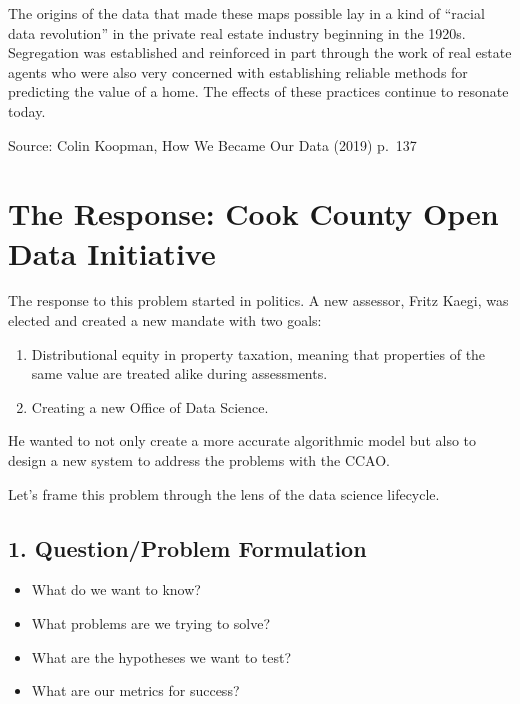 \documentclass[
  letterpaper,
  DIV=11,
  numbers=noendperiod]{scrreprt}
\providecommand{\tightlist}{%
  \setlength{\itemsep}{0pt}\setlength{\parskip}{0pt}}\usepackage{longtable,booktabs,array}
\begin{document}
The origins of the data that made these maps possible lay in a kind of
``racial data revolution'' in the private real estate industry beginning
in the 1920s. Segregation was established and reinforced in part through
the work of real estate agents who were also very concerned with
establishing reliable methods for predicting the value of a home. The
effects of these practices continue to resonate today.

Source: Colin Koopman, How We Became Our Data (2019) p.~137

\section{The Response: Cook County Open Data
Initiative}\label{the-response-cook-county-open-data-initiative}

The response to this problem started in politics. A new assessor, Fritz
Kaegi, was elected and created a new mandate with two goals:

\begin{enumerate}
\def\labelenumi{\arabic{enumi}.}
\tightlist
\item
  Distributional equity in property taxation, meaning that properties of
  the same value are treated alike during assessments.
\item
  Creating a new Office of Data Science.
\end{enumerate}

He wanted to not only create a more accurate algorithmic model but also
to design a new system to address the problems with the CCAO.

Let's frame this problem through the lens of the data science lifecycle.

\subsection{1. Question/Problem
Formulation}\label{questionproblem-formulation}

\begin{tcolorbox}[enhanced jigsaw, coltitle=black, leftrule=.75mm, left=2mm, bottomrule=.15mm, bottomtitle=1mm, opacityback=0, breakable, arc=.35mm, opacitybacktitle=0.6, toptitle=1mm, title=\textcolor{quarto-callout-note-color}{\faInfo}\hspace{0.5em}{Driving Questions}, colbacktitle=quarto-callout-note-color!10!white, titlerule=0mm, rightrule=.15mm, colframe=quarto-callout-note-color-frame, toprule=.15mm, colback=white]

\begin{itemize}
\tightlist
\item
  What do we want to know?
\item
  What problems are we trying to solve?
\item
  What are the hypotheses we want to test?
\item
  What are our metrics for success?
\end{itemize}

\end{tcolorbox}
\end{document}
